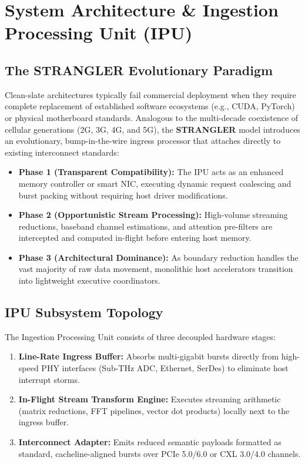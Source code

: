 \chapter{System Architecture \& Ingestion Processing Unit (IPU)}
\label{chap:architecture}

\section{The STRANGLER Evolutionary Paradigm}
Clean-slate architectures typically fail commercial deployment when they require complete replacement of established software ecosystems (e.g., CUDA, PyTorch) or physical motherboard standards. Analogous to the multi-decade coexistence of cellular generations (2G, 3G, 4G, and 5G), the \textbf{STRANGLER} model introduces an evolutionary, bump-in-the-wire ingress processor that attaches directly to existing interconnect standards:

\begin{itemize}
    \item \textbf{Phase 1 (Transparent Compatibility):} The IPU acts as an enhanced memory controller or smart NIC, executing dynamic request coalescing and burst packing without requiring host driver modifications.
    \item \textbf{Phase 2 (Opportunistic Stream Processing):} High-volume streaming reductions, baseband channel estimations, and attention pre-filters are intercepted and computed in-flight before entering host memory.
    \item \textbf{Phase 3 (Architectural Dominance):} As boundary reduction handles the vast majority of raw data movement, monolithic host accelerators transition into lightweight executive coordinators.
\end{itemize}

\section{IPU Subsystem Topology}
The Ingestion Processing Unit consists of three decoupled hardware stages:
\begin{enumerate}
    \item \textbf{Line-Rate Ingress Buffer:} Absorbs multi-gigabit bursts directly from high-speed PHY interfaces (Sub-THz ADC, Ethernet, SerDes) to eliminate host interrupt storms.
    \item \textbf{In-Flight Stream Transform Engine:} Executes streaming arithmetic (matrix reductions, FFT pipelines, vector dot products) locally next to the ingress buffer.
    \item \textbf{Interconnect Adapter:} Emits reduced semantic payloads formatted as standard, cacheline-aligned bursts over PCIe 5.0/6.0 or CXL 3.0/4.0 channels.
\end{enumerate}
